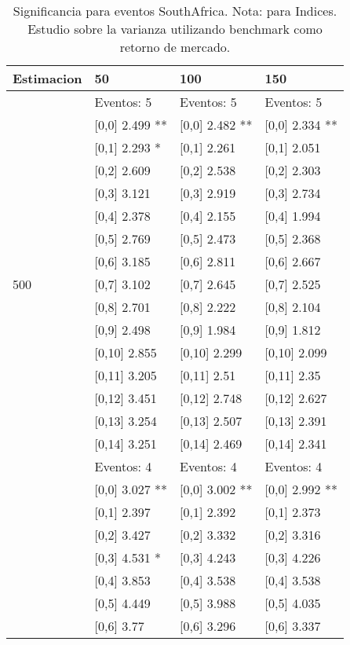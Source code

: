 \begin{table}

\caption{Significancia para eventos SouthAfrica. Nota: para Indices. Estudio sobre la varianza utilizando benchmark como retorno de mercado.}
\centering
\begin{tabular}[t]{llll}
\toprule
Estimacion & 50 & 100 & 150\\
\midrule
 & Eventos:  5 & Eventos:  5 & Eventos:  5\\
 & {}[0,0] 2.499 ** & {}[0,0] 2.482 ** & {}[0,0] 2.334 **\\
 & {}[0,1] 2.293 * & {}[0,1] 2.261 & {}[0,1] 2.051\\
 & {}[0,2] 2.609 & {}[0,2] 2.538 & {}[0,2] 2.303\\
 & {}[0,3] 3.121 & {}[0,3] 2.919 & {}[0,3] 2.734\\
\addlinespace
 & {}[0,4] 2.378 & {}[0,4] 2.155 & {}[0,4] 1.994\\
 & {}[0,5] 2.769 & {}[0,5] 2.473 & {}[0,5] 2.368\\
 & {}[0,6] 3.185 & {}[0,6] 2.811 & {}[0,6] 2.667\\
500 & {}[0,7] 3.102 & {}[0,7] 2.645 & {}[0,7] 2.525\\
 & {}[0,8] 2.701 & {}[0,8] 2.222 & {}[0,8] 2.104\\
\addlinespace
 & {}[0,9] 2.498 & {}[0,9] 1.984 & {}[0,9] 1.812\\
 & {}[0,10] 2.855 & {}[0,10] 2.299 & {}[0,10] 2.099\\
 & {}[0,11] 3.205 & {}[0,11] 2.51 & {}[0,11] 2.35\\
 & {}[0,12] 3.451 & {}[0,12] 2.748 & {}[0,12] 2.627\\
 & {}[0,13] 3.254 & {}[0,13] 2.507 & {}[0,13] 2.391\\
\addlinespace
 & {}[0,14] 3.251 & {}[0,14] 2.469 & {}[0,14] 2.341\\
 & Eventos:  4 & Eventos:  4 & Eventos:  4\\
 & {}[0,0] 3.027 ** & {}[0,0] 3.002 ** & {}[0,0] 2.992 **\\
 & {}[0,1] 2.397 & {}[0,1] 2.392 & {}[0,1] 2.373\\
 & {}[0,2] 3.427 & {}[0,2] 3.332 & {}[0,2] 3.316\\
\addlinespace
 & {}[0,3] 4.531 * & {}[0,3] 4.243 & {}[0,3] 4.226\\
 & {}[0,4] 3.853 & {}[0,4] 3.538 & {}[0,4] 3.538\\
 & {}[0,5] 4.449 & {}[0,5] 3.988 & {}[0,5] 4.035\\
 & {}[0,6] 3.77 & {}[0,6] 3.296 & {}[0,6] 3.337\\

\end{tabular}
\end{table}
